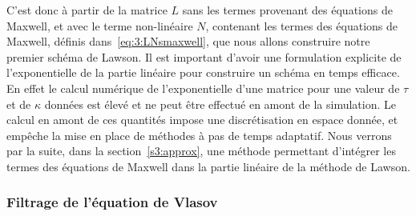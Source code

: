 C'est donc à partir de la matrice $L$ sans les termes provenant des équations de Maxwell, et avec le terme non-linéaire $N$, contenant les termes des équations de Maxwell, définis dans~\eqref{eq:3:LNsmaxwell}, que nous allons construire notre premier schéma de Lawson. Il est important d'avoir une formulation explicite de l'exponentielle de la partie linéaire pour construire un schéma en temps efficace. En effet le calcul numérique de l'exponentielle d'une matrice pour une valeur de $\tau$ et de $\kappa$ données est élevé et ne peut être effectué en amont de la simulation. Le calcul en amont de ces quantités impose une discrétisation en espace donnée, et empêche la mise en place de méthodes à pas de temps adaptatif. Nous verrons par la suite, dans la section~\ref{s3:approx}, une méthode permettant d'intégrer les termes des équations de Maxwell dans la partie linéaire de la méthode de Lawson.

\subsubsection{Filtrage de l'équation de Vlasov}
\label{ssec:3:filtrage}

